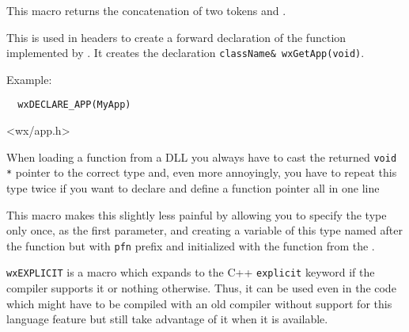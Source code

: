 \label{wxconcat}


This macro returns the concatenation of two tokens  and .


\label{wxdeclareapp}


This is used in headers to create a forward declaration of the
 function implemented by
. It creates the declaration
{\tt className\& wxGetApp(void)}.

Example:

\begin{verbatim}
  wxDECLARE_APP(MyApp)
\end{verbatim}


<wx/app.h>


\label{wxdynlibfunction}


When loading a function from a DLL you always have to cast the returned
{\tt void *} pointer to the correct type and, even more annoyingly, you have to
repeat this type twice if you want to declare and define a function pointer all
in one line

This macro makes this slightly less painful by allowing you to specify the
type only once, as the first parameter, and creating a variable of this type
named after the function but with {\tt pfn} prefix and initialized with the
function  from the 
.







\label{wxexplicit}

{\tt wxEXPLICIT} is a macro which expands to the C++ {\tt explicit} keyword if
the compiler supports it or nothing otherwise. Thus, it can be used even in the
code which might have to be compiled with an old compiler without support for
this language feature but still take advantage of it when it is available.



